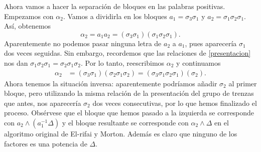 \documentclass[TFG.tex]{subfiles}
\begin{document}
\begin{ej}
Ahora vamos a hacer la separación de bloques en las palabras positivas. Empezamos con $\alpha_2$. Vamos a dividirla en los bloques $a_1=\sigma_3\sigma_1$ y $a_2=\sigma_1\sigma_2\sigma_1$. Así, obtenemos
\[
\alpha_2=a_1a_2=(\sigma_3\sigma_1)(\sigma_1\sigma_2\sigma_1).
\]
Aparentemente no podemos pasar ninguna letra de $a_2$ a $a_1$, pues aparecería $\sigma_1$ dos veces seguidas. Sin embargo, recordemos que las relaciones de \ref{presentacion} nos dan $\sigma_1\sigma_2\sigma_1=\sigma_2\sigma_1\sigma_2$. Por lo tanto, reescribimos $\alpha_2$ y continuamos
\begin{align*}
\alpha_2&=(\sigma_3\sigma_1)(\sigma_2\sigma_1\sigma_2)=(\sigma_3\sigma_1\sigma_2\sigma_1)(\sigma_2).
\end{align*}
Ahora tenemos la situación inversa: aparentemente podríamos añadir $\sigma_2$ al primer bloque, pero utilizando la misma relación de la presentación del grupo de trenzas que antes, nos aparecería $\sigma_2$ dos veces consecutivas, por lo que hemos finalizado el proceso. Obsérvese que el bloque que hemos pasado a la izquierda se corresponde con $a_2\land (a_1^{-1}\Delta)$ y el bloque resultante se corresponde con $\alpha_2\land\Delta$ en el algoritmo original de El-rifai y Morton. Además es claro que ninguno de los factores es una potencia de $\Delta$.


\end{ej}
\end{document}
